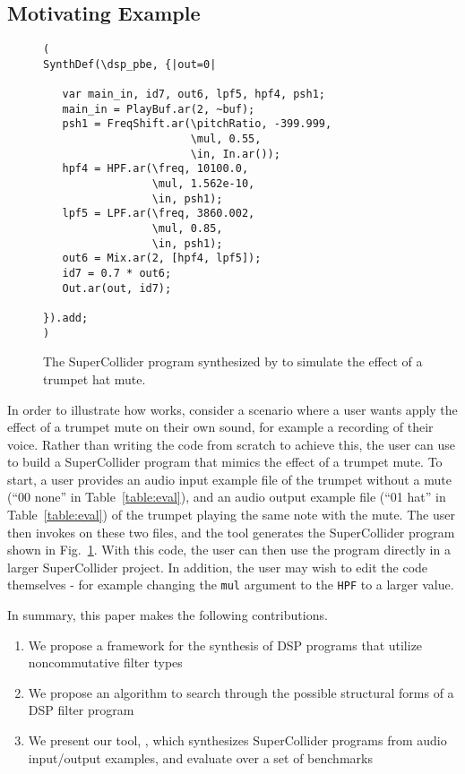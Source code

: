 \subsection{Motivating Example}


\begin{figure}
\begin{lstlisting}
( 
SynthDef(\dsp_pbe, {|out=0|

   var main_in, id7, out6, lpf5, hpf4, psh1;
   main_in = PlayBuf.ar(2, ~buf);
   psh1 = FreqShift.ar(\pitchRatio, -399.999, 
                       \mul, 0.55, 
                       \in, In.ar());
   hpf4 = HPF.ar(\freq, 10100.0, 
                 \mul, 1.562e-10, 
                 \in, psh1);
   lpf5 = LPF.ar(\freq, 3860.002, 
                 \mul, 0.85, 
                 \in, psh1);
   out6 = Mix.ar(2, [hpf4, lpf5]);
   id7 = 0.7 * out6;
   Out.ar(out, id7);

}).add;
)
\end{lstlisting}
\caption{The SuperCollider program synthesized by \ourTool to simulate the effect of a trumpet hat mute.}
\label{fig:sc_code}
\end{figure}

In order to illustrate how \ourTool works, consider a scenario where a user wants apply the effect of a trumpet mute on their own sound, for example a recording of their voice.
Rather than writing the code from scratch to achieve this, the user can use \ourTool to build a SuperCollider program that mimics the effect of a trumpet mute.
To start, a user provides an audio input example file of the trumpet without a mute (``00 none'' in Table~\ref{table:eval}), and an audio output example file (``01 hat'' in Table~\ref{table:eval}) of the trumpet playing the same note with the mute.
The user then invokes \ourTool on these two files, and the tool generates the SuperCollider program shown in Fig.~\ref{fig:sc_code}.
With this code, the user can then use the program directly in a larger SuperCollider project.
In addition, the user may wish to edit the code themselves - for example changing the \texttt{mul} argument to the \texttt{HPF} to a larger value.

In summary, this paper makes the following contributions.

\begin{enumerate}
\item We propose a framework for the synthesis of DSP programs that utilize noncommutative filter types 
\item We propose an algorithm to search through the possible structural forms of a DSP filter program
\item We present our tool, \ourTool, which synthesizes SuperCollider programs from audio input/output examples, and evaluate \ourTool over a set of benchmarks
\end{enumerate}


